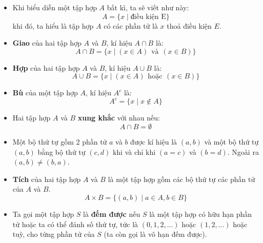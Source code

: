 \begin{itemize}


    \item Khi biểu diễn một tập hợp $A$ bất kì, ta sẽ viết như này:
    $$
    A = \{ x \mid \text{điều kiện E} \}
    $$
    khi đó, ta hiểu là tập hợp $A$ có các phần tử là $x$ thoả điều kiện $E$.

    \item \textbf{Giao} của hai tập hợp $A$ và $B$, kí hiệu $A \cap B$ là:
    $$
    A \cap B = \{ x \mid (x \in A) \hspace{5pt} \text{và} \hspace{5pt} (x \in B) \}
    $$

    \item \textbf{Hợp} của hai tập hợp $A$ và $B$, kí hiệu $A \cup B$ là:
    $$
    A \cup B = \{ x \mid (x \in A) \hspace{5pt} \text{hoặc} \hspace{5pt} (x \in B) \}
    $$

    \item \textbf{Bù} của một tập hợp $A$, kí hiệu $A^c$ là:
    $$
    A^c = \{ x \mid x \notin A\}
    $$

    \item Hai tập hợp $A$ và $B$ \textbf{xung khắc} với nhau nếu:
    $$
    A \cap B = \emptyset
    $$

    \item Một bộ thứ tự gồm 2 phần tử $a$ và $b$ được kí hiệu là $(a, b)$ và một bộ thứ tự $(a,b)$ bằng bộ thứ tự $(c, d)$ khi và chỉ khi $(a = c)$ và $(b = d)$. Ngoài ra $(a, b) \neq (b, a)$.

    \item \textbf{Tích} của hai tập hợp $A$ và $B$ là một tập hợp gồm các bộ thứ tự các phần tử của $A$ và $B$.
    $$
    A \times B = \{ (a,b) \mid a \in A, b \in B\}
    $$
    
    
    \item Ta gọi một tập hợp $S$ là \textbf{đếm được} nếu $S$ là một tập hợp có hữu hạn phần tử hoặc ta có thể đánh số thứ tự, tức là $(0, 1, 2, ...)$ hoặc $(1, 2, ...)$ hoặc tuỳ, cho từng phần tử của $S$ (ta còn gọi là vô hạn đếm được).


\end{itemize}
